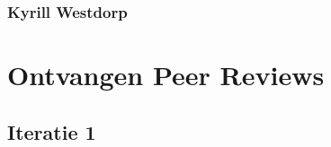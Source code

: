 \documentclass[a4paper]{report}
\begin{document}
\subsubsection{Kyrill Westdorp}
\noindent
\begin{minipage}{\textwidth}
  \centering
\end{minipage}

\clearpage

\section{Ontvangen Peer Reviews}
\subsection{Iteratie 1}
\end{document}
